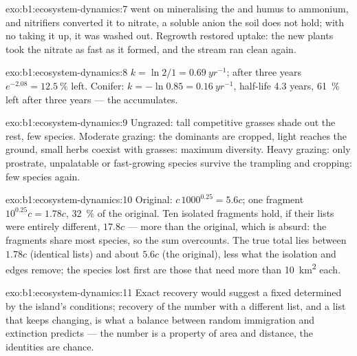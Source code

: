 \begin{solution}{exo:b1:ecosystem-dynamics:7}
 went on mineralising the  and humus to ammonium,
and nitrifiers converted it to nitrate, a soluble anion the soil
does not hold; with no  taking it up, it was washed out. Regrowth
restored uptake: the new plants took the nitrate as fast as it
formed, and the stream ran clean again.
\end{solution}

\begin{solution}{exo:b1:ecosystem-dynamics:8}
$k = \ln 2/1 = \qty{0.69}{yr^{-1}}$; after three years $e^{-2.08} =
\qty{12.5}{\%}$ left. Conifer: $k = -\ln 0.85 = \qty{0.16}{yr^{-1}}$,
half-life \num{4.3} years, \qty{61}{\%} left after three years --- the
 accumulates.
\end{solution}

\begin{solution}{exo:b1:ecosystem-dynamics:9}
Ungrazed: tall competitive grasses shade out the rest, few species.
Moderate grazing: the dominants are cropped, light reaches the
ground, small herbs coexist with grasses: maximum diversity. Heavy
grazing: only prostrate, unpalatable or fast-growing species survive
the trampling and cropping: few species again.
\end{solution}

\begin{solution}{exo:b1:ecosystem-dynamics:10}
Original: $c\,1000^{0.25} = 5.6c$; one fragment $10^{0.25}c = 1.78c$,
\qty{32}{\%} of the original. Ten isolated fragments hold, if their
lists were entirely different, $17.8c$ --- more than the original,
which is absurd: the fragments share most species, so the sum
overcounts. The true total lies between $1.78c$ (identical lists) and
about $5.6c$ (the original), less what the isolation and edges
remove; the species lost first are those that need more than
\qty{10}{km^2} each.
\end{solution}

\begin{solution}{exo:b1:ecosystem-dynamics:11}
Exact recovery would suggest a fixed  determined by the
island's conditions; recovery of the number with a different list,
and a list that keeps changing, is what a balance between random
immigration and extinction predicts --- the number is a property of
area and distance, the identities are chance.
\end{solution}

